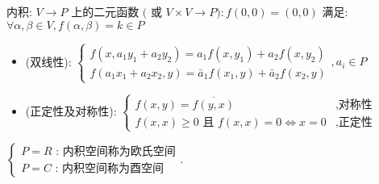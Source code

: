 内积: \( V \rightarrow P \) 上的二元函数 \( ( \) 或 \( V \times V \rightarrow P): f(0,0)=(0,0) \) 满足:
\( \forall \alpha, \beta \in V, f(\alpha, \beta)=k \in P \)


\begin{itemize}
\item (双线性): \( \left\{\begin{array}{l}f\left(x, a_{1} y_{1}+a_{2} y_{2}\right)=a_{1} f\left(x, y_{1}\right)+a_{2} f\left(x, y_{2}\right) \\ f\left(a_{1} x_{1}+a_{2} x_{2}, y\right)=\bar{a}_{1} f\left(x_{1}, y\right)+\bar{a}_{2} f\left(x_{2}, y\right)\end{array}, a_{i} \in P\right. \)
\item(正定性及对称性): \( \left\{\begin{array}{lr}f(x, y)=\overline{f(y, x)}&,\mbox{对称性} \\ f(x, x) \geq 0 \text { 且 } f(x, x)=0 \Leftrightarrow x=0&,\mbox{正定性} \end{array}\right. \)
\end{itemize}

\begin{note}
\( \left\{\begin{array}{l} P=R \text { : 内积空间称为欧氏空间}  \\  P=C \text { : 内积空间称为酉空间 }\end{array}\right. \).
\end{note}


